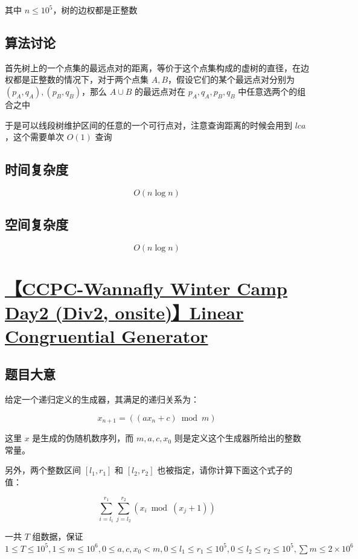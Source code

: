 \documentclass[UTF8]{article}
\begin{document}
其中 $n \le 10^5$，树的边权都是正整数

\subsection{算法讨论}

首先树上的一个点集的最远点对的距离，等价于这个点集构成的虚树的直径，在边权都是正整数的情况下，对于两个点集 $A,B$，假设它们的某个最远点对分别为 $(p_A,q_A),(p_B,q_B)$，那么 $A \cup B$ 的最远点对在 $p_A,q_A,p_B,q_B$ 中任意选两个的组合之中

于是可以线段树维护区间的任意的一个可行点对，注意查询距离的时候会用到 $lca$，这个需要单次 $O(1)$ 查询

\subsection{时间复杂度}

$$
O(n \log n)
$$

\subsection{空间复杂度}

$$
O(n \log n)
$$

\section{\href{https://www.zhixincode.com/contest/8/problem/G?problem_id=128}{【CCPC-Wannafly Winter Camp Day2 (Div2, onsite)】Linear Congruential Generator}}

\subsection{题目大意}

给定一个递归定义的生成器，其满足的递归关系为：

$$
x_{n + 1} = ((a x_n + c) \bmod m)
$$

这里 $x$ 是生成的伪随机数序列，而 $m, a, c, x_0$ 则是定义这个生成器所给出的整数常量。

另外，两个整数区间 $[l_1, r_1]$ 和 $[l_2, r_2]$ 也被指定，请你计算下面这个式子的值：

$$
\sum_{i = l_1}^{r_1}\sum_{j = l_2}^{r_2}{(x_i \bmod (x_j + 1))}
$$

一共 $T$ 组数据，保证 $1 \le T \le 10^5,1 \le m \le 10^6, 0 \le a, c, x_0 < m, 0 \le l_1 \le r_1  \le 10^5, 0 \le l_2 \le r_2 \le 10^5,\sum m \le 2 \times 10^6$
\end{document}
